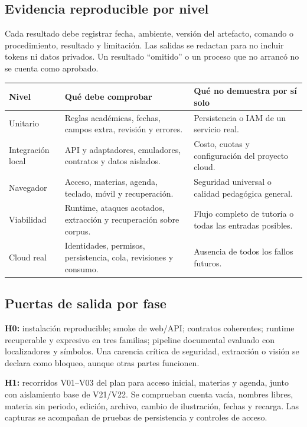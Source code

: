 \subsection{Evidencia reproducible por nivel}
Cada resultado debe registrar fecha, ambiente, versión del artefacto, comando o procedimiento, resultado y limitación. Las salidas se redactan para no incluir tokens ni datos privados. Un resultado ``omitido'' o un proceso que no arrancó no se cuenta como aprobado.

\small
\begin{tabularx}{\linewidth}{P{2.2cm}Y Y}
\toprule
\textbf{Nivel} & \textbf{Qué debe comprobar} & \textbf{Qué no demuestra por sí solo}\\
\midrule
Unitario & Reglas académicas, fechas, campos extra, revisión y errores. & Persistencia o IAM de un servicio real.\\
Integración local & API y adaptadores, emuladores, contratos y datos aislados. & Costo, cuotas y configuración del proyecto cloud.\\
Navegador & Acceso, materias, agenda, teclado, móvil y recuperación. & Seguridad universal o calidad pedagógica general.\\
Viabilidad & Runtime, ataques acotados, extracción y recuperación sobre corpus. & Flujo completo de tutoría o todas las entradas posibles.\\
Cloud real & Identidades, permisos, persistencia, cola, revisiones y consumo. & Ausencia de todos los fallos futuros.\\
\bottomrule
\end{tabularx}
\normalsize
\subsection{Puertas de salida por fase}
\textbf{H0:} instalación reproducible; smoke de web/API; contratos coherentes; runtime recuperable y expresivo en tres familias; pipeline documental evaluado con localizadores y símbolos. Una carencia crítica de seguridad, extracción o visión se declara como bloqueo, aunque otras partes funcionen.

\textbf{H1:} recorridos V01--V03 del plan para acceso inicial, materias y agenda, junto con aislamiento base de V21/V22. Se comprueban cuenta vacía, nombres libres, materia sin periodo, edición, archivo, cambio de ilustración, fechas y recarga. Las capturas se acompañan de pruebas de persistencia y controles de acceso.

